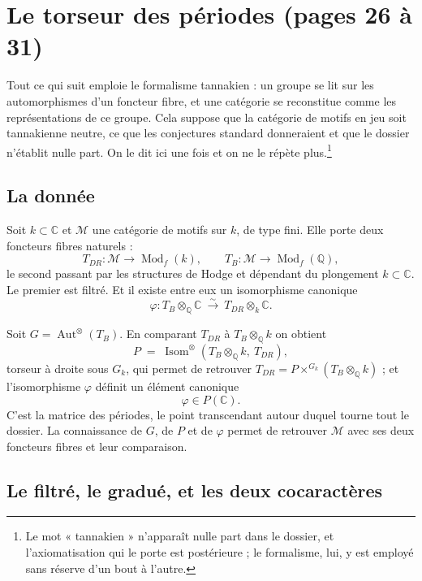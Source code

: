 \documentclass[11pt,a4paper]{article}
\begin{document}
\section*{Le torseur des périodes (pages 26 à 31)}

Tout ce qui suit emploie le formalisme tannakien : un groupe se lit sur les
automorphismes d'un foncteur fibre, et une catégorie se reconstitue comme les
représentations de ce groupe. Cela suppose que la catégorie de motifs en jeu
soit tannakienne neutre, ce que les conjectures standard donneraient et que le
dossier n'établit nulle part. On le dit ici une fois et on ne le répète
plus.\footnote{Le mot « tannakien » n'apparaît nulle part dans le dossier, et
l'axiomatisation qui le porte est postérieure ; le formalisme, lui, y est
employé sans réserve d'un bout à l'autre.}

\subsection*{La donnée}

Soit $k \subset \mathbb{C}$ et $\mathcal{M}$ une catégorie de motifs sur $k$, de
type fini. Elle porte deux foncteurs fibres naturels :
\[
T_{DR} : \mathcal{M} \longrightarrow \operatorname{Mod}_{f}(k) ,
\qquad
T_{B} : \mathcal{M} \longrightarrow \operatorname{Mod}_{f}(\mathbb{Q}) ,
\]
le second passant par les structures de Hodge et dépendant du plongement
$k \subset \mathbb{C}$. Le premier est filtré. Et il existe entre eux un
isomorphisme canonique
\[
\varphi : T_{B} \otimes_{\mathbb{Q}} \mathbb{C} \ \overset{\sim}{\longrightarrow}\ T_{DR} \otimes_{k} \mathbb{C} .
\]

Soit $G = \operatorname{Aut}^{\otimes}(T_{B})$. En comparant $T_{DR}$ à
$T_{B} \otimes_{\mathbb{Q}} k$ on obtient
\[
P \;=\; \operatorname{Isom}^{\otimes}(T_{B} \otimes_{\mathbb{Q}} k,\ T_{DR}) ,
\]
torseur à droite sous $G_{k}$, qui permet de retrouver $T_{DR} = P \times^{G_{k}}
(T_{B} \otimes_{\mathbb{Q}} k)$ ; et l'isomorphisme $\varphi$ définit un élément
canonique
\[
\varphi \in P(\mathbb{C}) .
\]
C'est la matrice des périodes, le point transcendant autour duquel
tourne tout le dossier. La connaissance de $G$, de $P$ et de $\varphi$ permet de
retrouver $\mathcal{M}$ avec ses deux foncteurs fibres et leur comparaison.

\subsection*{Le filtré, le gradué, et les deux cocaractères}
\end{document}
